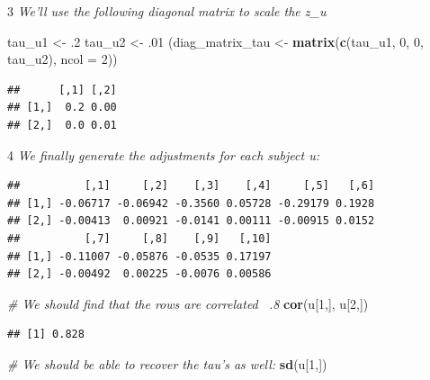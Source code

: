 \documentclass[12pt,]{krantz}
\newenvironment{Shaded}{\begin{snugshade}}{\end{snugshade}}
\newcommand{\CommentTok}[1]{\textcolor[rgb]{0.56,0.35,0.01}{\textit{#1}}}
\newcommand{\DataTypeTok}[1]{\textcolor[rgb]{0.13,0.29,0.53}{#1}}
\newcommand{\DecValTok}[1]{\textcolor[rgb]{0.00,0.00,0.81}{#1}}
\newcommand{\FloatTok}[1]{\textcolor[rgb]{0.00,0.00,0.81}{#1}}
\newcommand{\KeywordTok}[1]{\textcolor[rgb]{0.13,0.29,0.53}{\textbf{#1}}}
\newcommand{\NormalTok}[1]{#1}
\newcommand{\OperatorTok}[1]{\textcolor[rgb]{0.81,0.36,0.00}{\textbf{#1}}}
\newcommand{\StringTok}[1]{\textcolor[rgb]{0.31,0.60,0.02}{#1}}
\theoremstyle{definition}
\theoremstyle{definition}
\theoremstyle{definition}
\theoremstyle{remark}
\begin{document}
3 \emph{We'll use the following diagonal matrix to scale the z\_u}

\begin{Shaded}
\begin{Highlighting}[]
\NormalTok{ tau_u1 <-}\StringTok{ }\FloatTok{.2}
\NormalTok{ tau_u2 <-}\StringTok{ }\FloatTok{.01}
\NormalTok{ (diag_matrix_tau <-}\StringTok{ }\KeywordTok{matrix}\NormalTok{(}\KeywordTok{c}\NormalTok{(tau_u1, }\DecValTok{0}\NormalTok{, }\DecValTok{0}\NormalTok{, tau_u2), }\DataTypeTok{ncol =} \DecValTok{2}\NormalTok{))}
\end{Highlighting}
\end{Shaded}

\begin{verbatim}
##      [,1] [,2]
## [1,]  0.2 0.00
## [2,]  0.0 0.01
\end{verbatim}

4 \emph{We finally generate the adjustments for each subject u:}

\begin{Shaded}
\end{Shaded}

\begin{verbatim}
##          [,1]     [,2]    [,3]    [,4]     [,5]   [,6]
## [1,] -0.06717 -0.06942 -0.3560 0.05728 -0.29179 0.1928
## [2,] -0.00413  0.00921 -0.0141 0.00111 -0.00915 0.0152
##          [,7]     [,8]    [,9]   [,10]
## [1,] -0.11007 -0.05876 -0.0535 0.17197
## [2,] -0.00492  0.00225 -0.0076 0.00586
\end{verbatim}

\begin{Shaded}
\begin{Highlighting}[]
 \CommentTok{# We should find that the rows are correlated ~.8}
 \KeywordTok{cor}\NormalTok{(u[}\DecValTok{1}\NormalTok{,], u[}\DecValTok{2}\NormalTok{,])}
\end{Highlighting}
\end{Shaded}

\begin{verbatim}
## [1] 0.828
\end{verbatim}

\begin{Shaded}
\begin{Highlighting}[]
 \CommentTok{# We should be able to recover the tau's as well:}
 \KeywordTok{sd}\NormalTok{(u[}\DecValTok{1}\NormalTok{,])}
\end{Highlighting}
\end{Shaded}
\end{document}
